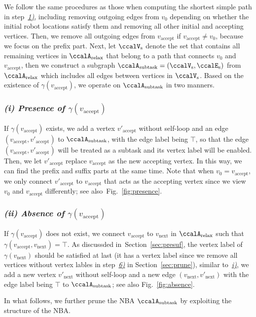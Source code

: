 \documentclass[journal]{IEEEtran}
\newcommand{\auto}[1]{\ccalA_{\text{#1}}}
\newcommand{\domanda}[1]{\subsubsection*{#1}}
\begin{document}
{{We follow the same procedures as those when computing the shortest simple path in step~\hyperref[sec:sort]{{\it 1)}}, including removing outgoing edges from $v_0$ depending on whether the initial robot locations satisfy them and removing all other initial and accepting vertices. Then, we remove all outgoing edges from $v_{\text{accept}}$ if $v_{\text{accept}} \not=v_0$, because we focus on the prefix part. Next, let $\ccalV_{\text{s}}$ denote the set that contains all remaining vertices in $ \auto{relax}$ that belong to a path that connects $v_0$ and $v_{\text{accept}}$, then we construct a subgraph $\auto{subtask}=(\ccalV_{\text{s}}, \ccalE_\text{s})$ from  $\auto{relax}$ which includes all edges between vertices in $\ccalV_{\text{s}}$. Based on the existence of $\gamma(v_{\text{accept}})$, we operate on $\auto{subtask}$ in two manners.
\domanda{\it (i) Presence of \upshape$\gamma(v_{\text{accept}})$}\label{i:presence} If $\gamma(v_{\text{accept}})$ exists, we add a vertex $v'_{\text{accept}}$ {without self-loop} and an edge $(v_{\text{accept}}, v'_{\text{accept}})$ to  $\auto{subtask}$, with the edge label being $\top$, so that the edge $(v_{\text{accept}}, v'_{\text{accept}})$ will be treated as a subtask and its vertex label will be enabled.
Then, we let $v'_{\text{accept}}$ replace $v_{\text{accept}}$ as the new accepting vertex. In this way, we can find the prefix and suffix parts at the same time. Note that when $v_0 = v_{\text{accept}}$, we only connect $v'_{\text{accept}}$ to $v_{\text{accept}}$ that acts as the accepting vertex since we view $v_0$ and $v_{\text{accept}}$ differently; see also~Fig.~\ref{fig:presence}.
        \domanda{\it (ii) Absence of \upshape$\gamma(v_{\text{accept}})$} If $\gamma(v_{\text{accept}})$ does not exist, we connect $v_{\text{accept}}$ to $v_{\text{next}}$ in $\auto{relax}$  such that $\gamma(v_{\text{accept}}, v_{\text{next}})= \top$. As discussded in~Section~\ref{sec:presuf}, the vertex label of $\gamma(v_{\text{next}})$ should be satisfied at last (it has a vertex label since we remove all vertices without vertex lables in step~\hyperref[prune:3]{{\it 6)}} in Section~\ref{sec:prune}), similar to~\hyperref[i:presence]{{\it i)}}, we add a new vertex $v'_{\text{next}}$ without self-loop and a new edge $(v_{\text{next}}, v'_{\text{next}})$ with the edge label being $\top$  to $\auto{subtask}$; see also Fig.~\ref{fig:absence}.}}


In what follows, we further prune the NBA $\auto{subtask}$  by exploiting the structure of the NBA.
\end{document}
